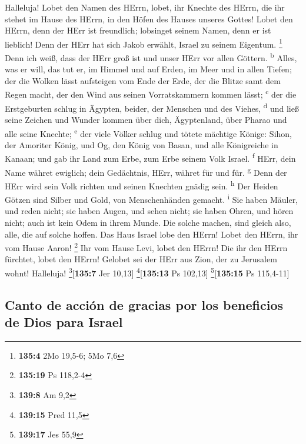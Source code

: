  Halleluja! Lobet den Namen des HErrn, lobet, ihr Knechte
des HErrn,  die ihr stehet im Hause des HErrn, in den
Höfen des Hauses unseres Gottes!  Lobet den HErrn, denn
der HErr ist freundlich; lobsinget seinem Namen, denn er ist lieblich!
 Denn der HErr hat sich Jakob erwählt, Israel zu seinem
Eigentum. \footnote{\textbf{135:4} 2Mo 19,5-6; 5Mo 7,6} 
Denn ich weiß, dass der HErr groß ist und unser HErr vor allen Göttern.
\textsuperscript{b}  Alles, was er will, das tut er, im
Himmel und auf Erden, im Meer und in allen Tiefen;  der
die Wolken lässt aufsteigen vom Ende der Erde, der die Blitze samt dem
Regen macht, der den Wind aus seinen Vorratskammern kommen lässt;
\textsuperscript{c}  der die Erstgeburten schlug in
Ägypten, beider, der Menschen und des Viehes, \textsuperscript{d}
 und ließ seine Zeichen und Wunder kommen über dich,
Ägyptenland, über Pharao und alle seine Knechte; \textsuperscript{e}
 der viele Völker schlug und tötete mächtige Könige:
 Sihon, der Amoriter König, und Og, den König von Basan,
und alle Königreiche in Kanaan;  und gab ihr Land zum
Erbe, zum Erbe seinem Volk Israel. \textsuperscript{f} 
HErr, dein Name währet ewiglich; dein Gedächtnis, HErr, währet für und
für. \textsuperscript{g}  Denn der HErr wird sein Volk
richten und seinen Knechten gnädig sein. \textsuperscript{h}
 Der Heiden Götzen sind Silber und Gold, von
Menschenhänden gemacht. \textsuperscript{i}  Sie haben
Mäuler, und reden nicht; sie haben Augen, und sehen nicht;
 sie haben Ohren, und hören nicht; auch ist kein Odem in
ihrem Munde.  Die solche machen, sind gleich also, alle,
die auf solche hoffen.  Das Haus Israel lobe den HErrn!
Lobet den HErrn, ihr vom Hause Aaron! \footnote{\textbf{135:19} Ps
  118,2-4}  Ihr vom Hause Levi, lobet den HErrn! Die ihr
den HErrn fürchtet, lobet den HErrn!  Gelobet sei der
HErr aus Zion, der zu Jerusalem wohnt! Halleluja!
\footnote{\textbf{139:8} Am 9,2}{[}\textbf{135:7} Jer 10,13{]}
\footnote{\textbf{139:15} Pred 11,5}{[}\textbf{135:13} Ps 102,13{]}
\footnote{\textbf{139:17} Jes 55,9}{[}\textbf{135:15} Ps 115,4-11{]}

\hypertarget{canto-de-acciuxf3n-de-gracias-por-los-beneficios-de-dios-para-israel}{%
\subsection{Canto de acción de gracias por los beneficios de Dios para
Israel}\label{canto-de-acciuxf3n-de-gracias-por-los-beneficios-de-dios-para-israel}}

